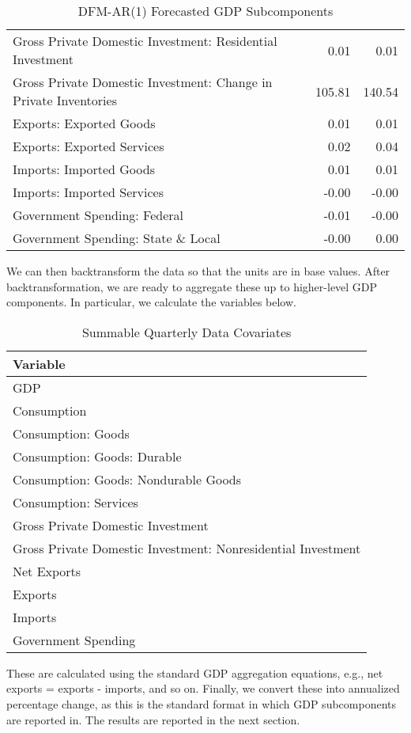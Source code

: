 \documentclass[11pt, letterpaper]{article}\usepackage[]{graphicx}\usepackage[]{color}
\begin{document}
\begin{table}[H]
\begin{tabular}{lrr}
  Gross Private Domestic Investment: Residential Investment & 0.01 & 0.01 \\ 
  Gross Private Domestic Investment: Change in Private Inventories & 105.81 & 140.54 \\ 
  Exports: Exported Goods & 0.01 & 0.01 \\ 
  Exports: Exported Services & 0.02 & 0.04 \\ 
  Imports: Imported Goods & 0.01 & 0.01 \\ 
  Imports: Imported Services & -0.00 & -0.00 \\ 
  Government Spending: Federal & -0.01 & -0.00 \\ 
  Government Spending: State \& Local & -0.00 & 0.00 \\ 
   \hline
\end{tabular}
\endgroup
\caption{DFM-AR(1) Forecasted GDP Subcomponents} 
\end{table}


We can then backtransform the data so that the units are in base values. After backtransformation, we are ready to aggregate these up to higher-level GDP components. In particular, we calculate the variables below.
\begin{table}[H]
\centering
\begingroup\scriptsize
\begin{tabular}{l}
  \hline
Variable \\ 
  \hline
GDP \\ 
  Consumption \\ 
  Consumption: Goods \\ 
  Consumption: Goods: Durable \\ 
  Consumption: Goods: Nondurable Goods \\ 
  Consumption: Services \\ 
  Gross Private Domestic Investment \\ 
  Gross Private Domestic Investment: Nonresidential Investment \\ 
  Net Exports \\ 
  Exports \\ 
  Imports \\ 
  Government Spending \\ 
   \hline
\end{tabular}
\endgroup
\caption{Summable Quarterly Data Covariates} 
\end{table}

These are calculated using the standard GDP aggregation equations, e.g., net exports = exports - imports, and so on.
Finally, we convert these into annualized percentage change, as this is the standard format in which GDP subcomponents are reported in. The results are reported in the next section.
\end{document}

